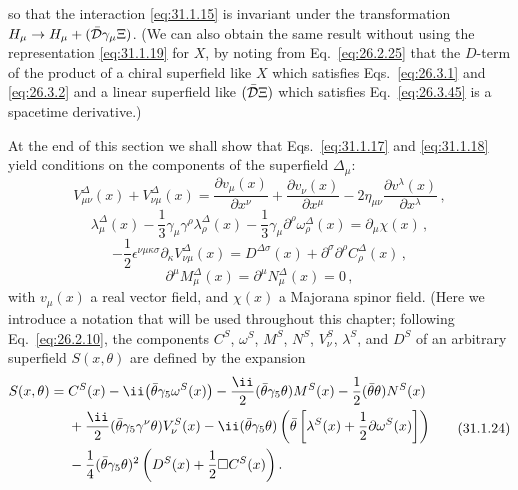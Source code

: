 so that the interaction \eqref{eq:31.1.15} is invariant under the
transformation
\(H_\mu\to H_\mu+(\bar{\mathcal{D}}\gamma_\mu\Xi)\). (We can also obtain the same
result without using the representation \eqref{eq:31.1.19} for \(X\), by
noting from Eq.~\eqref{eq:26.2.25} that the \(D\)-term of the product of a
chiral superfield like \(X\) which satisfies Eqs.~\eqref{eq:26.3.1} and
\eqref{eq:26.3.2} and a linear superfield like
\((\bar{\mathcal{D}}\Xi)\) which satisfies Eq.~\eqref{eq:26.3.45} is a spacetime
derivative.)

At the end of this section we shall show that Eqs.~\eqref{eq:31.1.17} and
\eqref{eq:31.1.18} yield conditions on the components of the superfield
\(\Delta_\mu\):
\begin{equation}
  V_{\mu\nu}^\Delta(x)+V_{\nu\mu}^\Delta(x)
  =\frac{\partial v_\mu(x)}{\partial x^\nu}
   +\frac{\partial v_\nu(x)}{\partial x^\mu}
   -2\eta_{\mu\nu}\frac{\partial v^\lambda(x)}{\partial x^\lambda}\,,
  \tag{31.1.20}\label{eq:31.1.20}
\end{equation}
\begin{equation}
  \lambda_\mu^\Delta(x)
  -\frac13\gamma_\mu\gamma^\rho\lambda_\rho^\Delta(x)
  -\frac13\gamma_\mu\partial^\rho\omega_\rho^\Delta(x)
  =\partial_\mu\chi(x)\,,
  \tag{31.1.21}\label{eq:31.1.21}
\end{equation}
\begin{equation}
  -\frac12\epsilon^{\nu\mu\kappa\sigma}
    \partial_\kappa V_{\nu\mu}^\Delta(x)
  =D^{\Delta\sigma}(x)+\partial^\sigma\partial^\rho C_\rho^\Delta(x)\,,
  \tag{31.1.22}\label{eq:31.1.22}
\end{equation}
\begin{equation}
  \partial^\mu M_\mu^\Delta(x)
  =\partial^\mu N_\mu^\Delta(x)=0\,,
  \tag{31.1.23}\label{eq:31.1.23}
\end{equation}
with \(v_\mu(x)\) a real vector field, and \(\chi(x)\) a Majorana spinor
field. (Here we introduce a notation that will be used throughout this
chapter; following Eq.~\eqref{eq:26.2.10}, the components \(C^S\),
\(\omega^S\), \(M^S\), \(N^S\), \(V_\nu^S\), \(\lambda^S\), and \(D^S\) of
an arbitrary superfield \(S(x,\theta)\) are defined by the expansion
\begin{equation}
  \begin{aligned}
  S(x,\theta)={}&C^S(x)-\ii\bigl(\bar\theta\gamma_5\omega^S(x)\bigr)
  -\frac{\ii}{2}(\bar\theta\gamma_5\theta)M^S(x)
  -\frac12(\bar\theta\theta)N^S(x)
  \\
  &+\frac{\ii}{2}(\bar\theta\gamma_5\gamma^\nu\theta)V_\nu^S(x)
  -\ii(\bar\theta\gamma_5\theta)
    \left(\bar\theta\left[
      \lambda^S(x)+\frac12\sl{\partial}\omega^S(x)
    \right]\right)
  \\
  &-\frac14(\bar\theta\gamma_5\theta)^2
    \left(D^S(x)+\frac12\Box C^S(x)\right).
  \end{aligned}
  \tag{31.1.24}\label{eq:31.1.24}
\end{equation}
